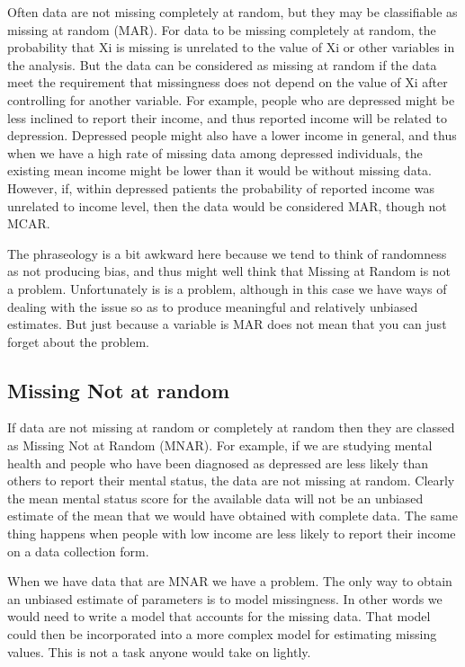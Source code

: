 Often data are not missing completely at random, but they may be classifiable as missing at random (MAR). For data to be missing completely at random, the probability that Xi is missing is unrelated to the value of Xi or other variables in the analysis. But the data can be considered as missing at random if the data meet the requirement that missingness does not depend on the value of Xi after controlling for another variable. For example, people who are depressed might be less inclined to report their income, and thus reported income will be related to depression. Depressed people might also have a lower income in general, and thus when we have a high rate of missing data among depressed individuals, the existing mean income might be lower than it would be without missing data. However, if, within depressed patients the probability of reported income was unrelated to income level, then the data would be considered MAR, though not MCAR.

The phraseology is a bit awkward here because we tend to think of randomness as not producing bias, and thus might well think that Missing at Random is not a problem. Unfortunately is is a problem, although in this case we have ways of dealing with the issue so as to produce meaningful and relatively unbiased estimates. But just because a variable is MAR does not mean that you can just forget about the problem.

\subsection{Missing Not at random}

If data are not missing at random or completely at random then they are classed as Missing Not at Random (MNAR). For example, if we are studying mental health and people who have been diagnosed as depressed are less likely than others to report their mental status, the data are not missing at random. Clearly the mean mental status score for the available data will not be an unbiased estimate of the mean that we would have obtained with complete data. The same thing happens when people with low income are less likely to report 
their income on a data collection form.

When we have data that are MNAR we have a problem. The only way to obtain an unbiased estimate of parameters is to model missingness. 
In other words we would need to write a model that accounts for the missing data. 
That model could then be incorporated into a more complex model for estimating 
missing values. This is not a task anyone would take on lightly. 




